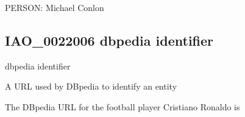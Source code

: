 \documentclass[letterpaper,10pt,english]{sphinxmanual}
\begin{document}
\begin{sphinxShadowBox}

\sphinxAtStartPar
{}
\end{sphinxShadowBox}

\begin{sphinxShadowBox}

\sphinxAtStartPar
PERSON: Michael Conlon
\end{sphinxShadowBox}
\begin{quote}

\ignorespaces \end{quote}


\subsection{IAO\_0022006 \sphinxhyphen{} dbpedia identifier}
\label{\detokenize{doc-IAO_0022006:iao-0022006-dbpedia-identifier}}\label{\detokenize{doc-IAO_0022006:index-0}}\label{\detokenize{doc-IAO_0022006::doc}}
\begin{sphinxShadowBox}

\sphinxAtStartPar
dbpedia identifier
\end{sphinxShadowBox}

\begin{sphinxShadowBox}

\sphinxAtStartPar
A URL used by DBpedia to identify an entity
\end{sphinxShadowBox}

\begin{sphinxShadowBox}

\sphinxAtStartPar
{}
\end{sphinxShadowBox}

\begin{sphinxShadowBox}

\sphinxAtStartPar
The DBpedia URL for the football player Cristiano Ronaldo is 
\end{sphinxShadowBox}
\end{document}
